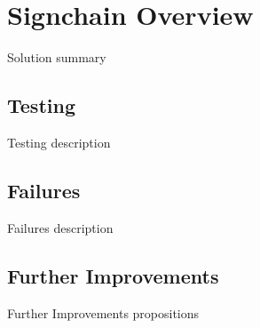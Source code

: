 \newpage
\section{Signchain Overview}
Solution summary

\subsection{Testing}
Testing description

\subsection{Failures}
Failures description

\subsection{Further Improvements}
Further Improvements propositions